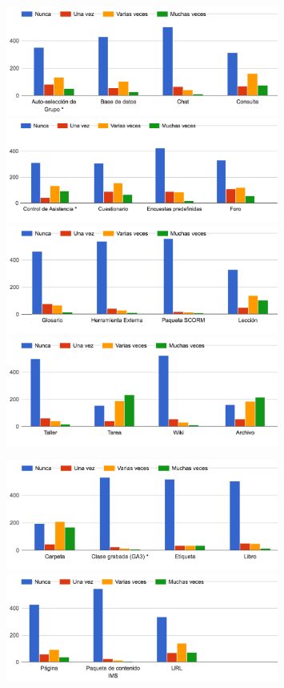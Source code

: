 \begin{enumerate}
\begin{figure}[H]
\centering
\includegraphics[width=0.8\textwidth]{../charts/05_actividades_01} 
\includegraphics[width=0.8\textwidth]{../charts/05_actividades_02} 
\includegraphics[width=0.8\textwidth]{../charts/05_actividades_03} 
\includegraphics[width=0.8\textwidth]{../charts/05_actividades_04} 
\end{figure}
\begin{figure}[H]
\centering
\includegraphics[width=0.8\textwidth]{../charts/05_actividades_05} 
\includegraphics[width=0.8\textwidth]{../charts/05_actividades_06} 


\end{figure}
\end{enumerate}
